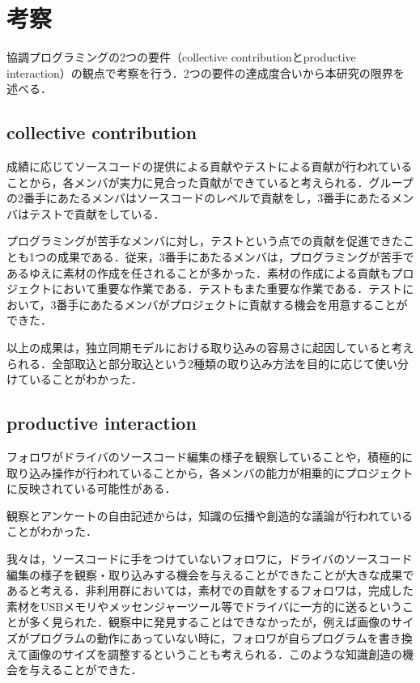 \chapter{考察}\label{DC}

協調プログラミングの2つの要件（collective contributionとproductive interaction）の観点で考察を行う．2つの要件の達成度合いから本研究の限界を述べる．


\section{collective contribution}

成績に応じてソースコードの提供による貢献やテストによる貢献が行われていることから，各メンバが実力に見合った貢献ができていると考えられる．グループの2番手にあたるメンバはソースコードのレベルで貢献をし，3番手にあたるメンバはテストで貢献をしている．

プログラミングが苦手なメンバに対し，テストという点での貢献を促進できたことも1つの成果である．従来，3番手にあたるメンバは，プログラミングが苦手であるゆえに素材の作成を任されることが多かった．素材の作成による貢献もプロジェクトにおいて重要な作業である．テストもまた重要な作業である．テストにおいて，3番手にあたるメンバがプロジェクトに貢献する機会を用意することができた．

以上の成果は，独立同期モデルにおける取り込みの容易さに起因していると考えられる．全部取込と部分取込という2種類の取り込み方法を目的に応じて使い分けていることがわかった．


\section{productive interaction}

フォロワがドライバのソースコード編集の様子を観察していることや，積極的に取り込み操作が行われていることから，各メンバの能力が相乗的にプロジェクトに反映されている可能性がある．

観察とアンケートの自由記述からは，知識の伝播や創造的な議論が行われていることがわかった．

我々は，ソースコードに手をつけていないフォロワに，ドライバのソースコード編集の様子を観察・取り込みする機会を与えることができたことが大きな成果であると考える．非利用群においては，素材での貢献をするフォロワは，完成した素材をUSBメモリやメッセンジャーツール等でドライバに一方的に送るということが多く見られた．観察中に発見することはできなかったが，例えば画像のサイズがプログラムの動作にあっていない時に，フォロワが自らプログラムを書き換えて画像のサイズを調整するということも考えられる．このような知識創造の機会を与えることができた．

